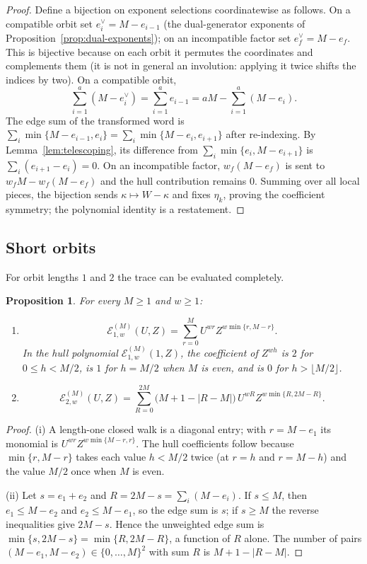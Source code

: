 \documentclass[preprint,12pt,a4paper]{elsarticle}
\newcommand{\Epoly}{\mathscr E}
\newtheorem{proposition}[theorem]{Proposition}
\theoremstyle{definition}
\theoremstyle{remark}
\begin{document}
\begin{proof}
Define a bijection on exponent selections coordinatewise as follows.  On a
compatible orbit set $e_i^\vee=M-e_{i-1}$ (the dual-generator exponents of
Proposition~\ref{prop:dual-exponents}); on an incompatible factor set
$e_f^\vee=M-e_f$.  This is bijective because on each orbit it permutes the
coordinates and complements them (it is not in general an involution: applying
it twice shifts the indices by two).  On a
compatible orbit,
\[
\sum_{i=1}^{a}(M-e_i^\vee)=\sum_{i=1}^{a}e_{i-1}
   =aM-\sum_{i=1}^{a}(M-e_i).
\]
The edge sum of the transformed word is
$\sum_i\min\{M-e_{i-1},e_i\}
 =\sum_i\min\{M-e_i,e_{i+1}\}$ after re-indexing.  By
Lemma~\ref{lem:telescoping}, its difference from
$\sum_i\min\{e_i,M-e_{i+1}\}$ is $\sum_i(e_{i+1}-e_i)=0$.  On an incompatible
factor, $w_f(M-e_f)$ is sent to $w_fM-w_f(M-e_f)$ and the hull contribution
remains $0$.  Summing over all local pieces, the bijection sends
$\kappa\mapsto W-\kappa$ and fixes $\eta_k$, proving the coefficient symmetry;
the polynomial identity is a restatement.
\end{proof}

\subsection{Short orbits}\label{sec:short-orbits}

For orbit lengths $1$ and $2$ the trace can be evaluated completely.

\begin{proposition}\label{prop:short-orbits}
For every $M\geq1$ and $w\geq1$:
\begin{enumerate}
\item[\textup{(i)}]
\[
\Epoly_{1,w}^{(M)}(U,Z)
 =\sum_{r=0}^{M}U^{wr}Z^{w\min\{r,M-r\}}.
\]
In the hull polynomial $\Epoly_{1,w}^{(M)}(1,Z)$, the coefficient of $Z^{wh}$
is $2$ for $0\leq h<M/2$, is $1$ for $h=M/2$ when $M$ is even, and is $0$ for
$h>\lfloor M/2\rfloor$.
\item[\textup{(ii)}]
{\small
\[
\Epoly_{2,w}^{(M)}(U,Z)
 =\sum_{R=0}^{2M}\bigl(M+1-|R-M|\bigr)\,
    U^{wR}Z^{w\min\{R,2M-R\}}.
\]}
\end{enumerate}
\end{proposition}

\begin{proof}
(i) A length-one closed walk is a diagonal entry; with $r=M-e_1$ its monomial is
$U^{wr}Z^{w\min\{M-r,r\}}$.  The hull coefficients follow because
$\min\{r,M-r\}$ takes each value $h<M/2$ twice (at $r=h$ and $r=M-h$) and the
value $M/2$ once when $M$ is even.

(ii) Let $s=e_1+e_2$ and $R=2M-s=\sum_i(M-e_i)$.  If $s\leq M$, then
$e_1\leq M-e_2$ and $e_2\leq M-e_1$, so the edge sum is $s$; if $s\geq M$ the
reverse inequalities give $2M-s$.  Hence the unweighted edge sum is
$\min\{s,2M-s\}=\min\{R,2M-R\}$, a function of $R$ alone.  The number of pairs
$(M-e_1,M-e_2)\in\{0,\ldots,M\}^2$ with sum $R$ is $M+1-|R-M|$.
\end{proof}
\end{document}
